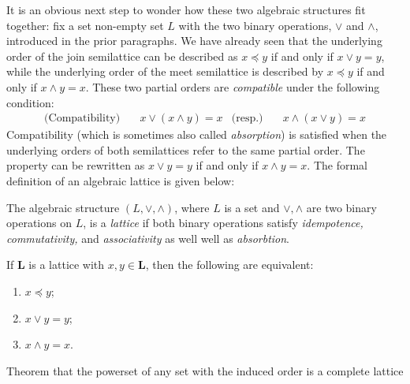 It is an obvious next step to wonder how these two algebraic structures fit together: fix a set non-empty set $L$ with the two binary operations, $\vee$ and $\wedge$, introduced in
the prior paragraphs. We have already seen that the underlying order of the join semilattice can be described as $x \preceq y$ if and only if $x \vee y = y$, while the underlying
order of the meet semilattice is described by $x \preceq y$ if and only if $x \wedge y = x$. These two partial orders are \textit{compatible} under the following condition:
\begin{align}
  \text{(Compatibility)} & \quad x \vee (x \wedge y) = x & \text{(resp.)} & \quad x \wedge (x \vee y) = x
\end{align}
%
Compatibility (which is sometimes also called \textit{absorption}) is satisfied when the underlying orders of both semilattices refer to the same partial order. The property can be
rewritten as $x \vee y = y$ if and only if $x \wedge y = x$. The formal definition of an algebraic lattice is given below:

\begin{definition}
  \label{definition:algebraic-lattice} The algebraic structure $(L, \vee, \wedge )$, where $L$ is a set and $\vee, \wedge$ are two binary operations on $L$, is a \emph{lattice} if
  both binary operations satisfy \textit{idempotence, commutativity,} and \textit{associativity} as well well as \textit{absorbtion}.
\end{definition}

\begin{lemma}
  \label{lemma:the-connecting-lemma} If $\mathbf{L}$ is a lattice with $x, y \in \mathbf{L}$, then the following are equivalent:
  \begin{enumerate}
    \setlength{\itemsep}{0pt}
    \setlength{\parsep}{0pt}

    \item $x \preceq y$;

    \item $x \vee y = y$;

    \item $x \wedge y = x$.
  \end{enumerate}
\end{lemma}

\begin{theorem}
  \label{theorem:powerset-lattice} Theorem that the powerset of any set with the induced order is a complete lattice
\end{theorem}

